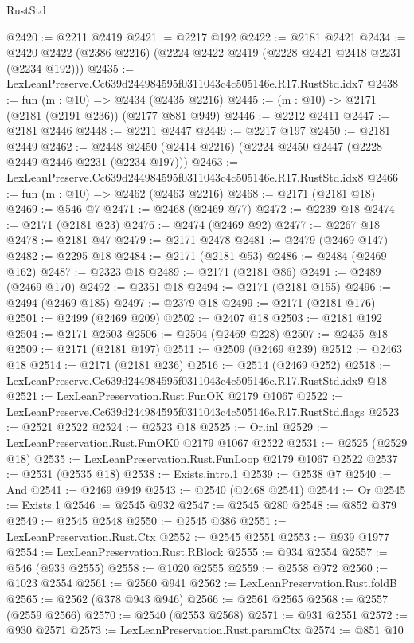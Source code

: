 \begin{lexlean}{RustStd}
\begin{coremodule}
@2420 := @2211 @2419
@2421 := @2217 @192
@2422 := @2181 @2421
@2434 := @2420 @2422 (@2386 @2216) (@2224 @2422 @2419 (@2228 @2421 @2418 @2231 (@2234 @192)))
@2435 := LexLeanPreserve.Cc639d244984595f0311043c4c505146e.R17.RustStd.idx7
@2438 := fun (m : @10) => @2434 (@2435 @2216)
@2445 := (m : @10) -> @2171 (@2181 (@2191 @236)) (@2177 @881 @949)
@2446 := @2212 @2411
@2447 := @2181 @2446
@2448 := @2211 @2447
@2449 := @2217 @197
@2450 := @2181 @2449
@2462 := @2448 @2450 (@2414 @2216) (@2224 @2450 @2447 (@2228 @2449 @2446 @2231 (@2234 @197)))
@2463 := LexLeanPreserve.Cc639d244984595f0311043c4c505146e.R17.RustStd.idx8
@2466 := fun (m : @10) => @2462 (@2463 @2216)
@2468 := @2171 (@2181 @18)
@2469 := @546 @7
@2471 := @2468 (@2469 @77)
@2472 := @2239 @18
@2474 := @2171 (@2181 @23)
@2476 := @2474 (@2469 @92)
@2477 := @2267 @18
@2478 := @2181 @47
@2479 := @2171 @2478
@2481 := @2479 (@2469 @147)
@2482 := @2295 @18
@2484 := @2171 (@2181 @53)
@2486 := @2484 (@2469 @162)
@2487 := @2323 @18
@2489 := @2171 (@2181 @86)
@2491 := @2489 (@2469 @170)
@2492 := @2351 @18
@2494 := @2171 (@2181 @155)
@2496 := @2494 (@2469 @185)
@2497 := @2379 @18
@2499 := @2171 (@2181 @176)
@2501 := @2499 (@2469 @209)
@2502 := @2407 @18
@2503 := @2181 @192
@2504 := @2171 @2503
@2506 := @2504 (@2469 @228)
@2507 := @2435 @18
@2509 := @2171 (@2181 @197)
@2511 := @2509 (@2469 @239)
@2512 := @2463 @18
@2514 := @2171 (@2181 @236)
@2516 := @2514 (@2469 @252)
@2518 := LexLeanPreserve.Cc639d244984595f0311043c4c505146e.R17.RustStd.idx9 @18
@2521 := LexLeanPreservation.Rust.FunOK @2179 @1067
@2522 := LexLeanPreserve.Cc639d244984595f0311043c4c505146e.R17.RustStd.flags
@2523 := @2521 @2522
@2524 := @2523 @18
@2525 := Or.inl
@2529 := LexLeanPreservation.Rust.FunOK0 @2179 @1067 @2522
@2531 := @2525 (@2529 @18)
@2535 := LexLeanPreservation.Rust.FunLoop @2179 @1067 @2522
@2537 := @2531 (@2535 @18)
@2538 := Exists.intro.{1}
@2539 := @2538 @7
@2540 := And
@2541 := @2469 @949
@2543 := @2540 (@2468 @2541)
@2544 := Or
@2545 := Exists.{1}
@2546 := @2545 @932
@2547 := @2545 @280
@2548 := @852 @379
@2549 := @2545 @2548
@2550 := @2545 @386
@2551 := LexLeanPreservation.Rust.Ctx
@2552 := @2545 @2551
@2553 := @939 @1977
@2554 := LexLeanPreservation.Rust.RBlock
@2555 := @934 @2554
@2557 := @546 (@933 @2555)
@2558 := @1020 @2555
@2559 := @2558 @972
@2560 := @1023 @2554
@2561 := @2560 @941
@2562 := LexLeanPreservation.Rust.foldB
@2565 := @2562 (@378 @943 @946)
@2566 := @2561 @2565
@2568 := @2557 (@2559 @2566)
@2570 := @2540 (@2553 @2568)
@2571 := @931 @2551
@2572 := @930 @2571
@2573 := LexLeanPreservation.Rust.paramCtx
@2574 := @851 @10

\end{coremodule}
\end{lexlean}
